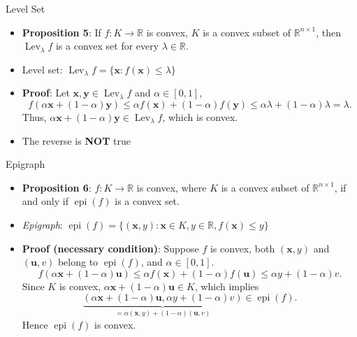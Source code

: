 \documentclass[aspectratio=169,hyperref,UTF8,CJK]{beamer}
\newcommand{\R}{\mathbb{R}}
\newcommand{\vect}[1]{\boldsymbol{#1}}
\begin{document}
\begin{frame}{Level Set}
  \small
  \begin{itemize}
    \item \textbf{Proposition 5}: If $f:K\to\R$ is convex, $K$ is a convex subset of $\R^{n\times1}$, then $\operatorname{Lev}_{\lambda}f$ is a convex set for every $\lambda\in\R$.
    \item Level set: $\operatorname{Lev}_{\lambda}f=\{\vect{x}:f(\vect{x})\le\lambda\}$
    \item \textbf{Proof}: Let $\vect{x},\vect{y}\in\operatorname{Lev}_{\lambda}f$ and $\alpha\in[0,1]$,
      \begin{equation*}
        f(\alpha\vect{x}+(1-\alpha)\vect{y})
        \le\alpha f(\vect{x})+(1-\alpha)f(\vect{y})
        \le\alpha\lambda+(1-\alpha)\lambda=\lambda.
      \end{equation*}
      Thus, $\alpha\vect{x}+(1-\alpha)\vect{y}\in\operatorname{Lev}_{\lambda}f$, which is convex.
    \item The reverse is \textbf{NOT} true
  \end{itemize}
\end{frame}

\begin{frame}{Epigraph}
  \scriptsize
  \begin{itemize}
    \item \textbf{Proposition 6}: $f:K\to\R$ is convex, where $K$ is a convex subset of $\R^{n\times1}$, if and only if $\operatorname{epi}(f)$ is a convex set.
    \item \emph{Epigraph}: $\operatorname{epi}(f)=\{(\vect{x},y):\vect{x}\in K,y\in\R,f(\vect{x})\le y\}$
    \item \textbf{Proof (necessary condition)}: Suppose $f$ is convex, both $(\vect{x},y)$ and $(\vect{u},v)$ belong to $\operatorname{epi}(f)$, and $\alpha\in[0,1]$.
      \begin{equation*}
        f(\alpha\vect{x}+(1-\alpha)\vect{u})
        \le\alpha f(\vect{x})+(1-\alpha)f(\vect{u})
        \le\alpha y+(1-\alpha)v.
      \end{equation*}
      Since $K$ is convex, $\alpha\vect{x}+(1-\alpha)\vect{u}\in K$, which implies
      \begin{equation*}
        \underbrace{(\alpha\vect{x}+(1-\alpha)\vect{u},\alpha y+(1-\alpha)v)}
        _{=\alpha(\vect{x},y)+(1-\alpha)(\vect{u},v)}\in\operatorname{epi}(f).
      \end{equation*}
      Hence $\operatorname{epi}(f)$ is convex.
  \end{itemize}
\end{frame}
\end{document}
